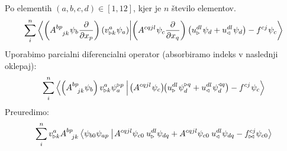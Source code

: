 Po elementih $(a,b,c,d) \in [1,12]$, kjer je $n$ število elementov.
\begin{equation}
   \sum^n_{i} \bra{
      \left(A^{bp}_{\phantom{bp}jk} \mkern1mu \psi_b \frac{\partial}{\partial x_p}\right)
         \left(v^a_{\triangleright k} \mkern1mu \psi_a\right)}
   \ket{
      \left(A^{cqjl} \mkern1mu \psi_c \frac{\partial}{\partial x_q}\right)
         \left(u^{dl}_\triangleright \mkern1mu \psi_d + u^{dl}_\triangleleft \mkern1mu \psi_d \right)
      -
      f^{cj} \mkern1mu \psi_c}
\end{equation}
Uporabimo parcialni diferencialni operator (absorbiramo indeks v naslednji oklepaj):
\begin{equation*}
   \sum^n_i \bra{
      \left( A^{bp}_{\mkern14mu jk} \psi_b \right)
         v^a_{\triangleright k} \psi^{\triangleright p}_a \mkern4mu}
   \ket{
      \mkern2mu \left(A^{cqjl} \mkern1mu \psi_c \right)
         \mkern-5mu \left(u^{dl}_\triangleright \mkern1mu \psi^{\triangleright q}_d
         +
         u^{dl}_\triangleleft \mkern1mu \psi^{\triangleleft q}_d \right)
      -
      f^{cj} \mkern1mu \psi_c}
\end{equation*}
Preuredimo:
\begin{equation*}
   \sum^n_i v^a_{\triangleright k} A^{bp}_{\mkern14mu jk} \bra{
      \psi_{b0}
         \psi_{ap} \mkern4mu}
   \ket{
      \mkern2mu
         A^{cqjl} \psi_{c0} \mkern4mu u^{dl}_\triangleright \psi_{dq}
         +
         A^{cqjl} \psi_{c0} \mkern4mu u^{dl}_\triangleleft \psi_{dq}
      -
      f^{cj}_{\bowtie} \psi_{c0}}
\end{equation*}

